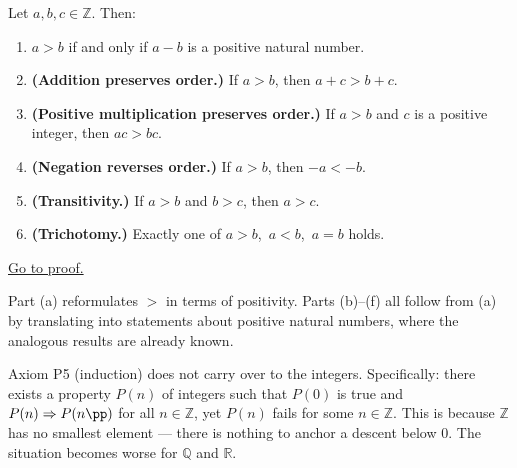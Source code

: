 \begin{lemma}
\label{lem:int-order}
Let $a, b, c \in \mathbb{Z}$. Then:
\begin{enumerate}
  \item[(a)] $a > b$ if and only if $a - b$ is a positive natural number.
  \item[(b)] \textbf{(Addition preserves order.)} If $a > b$, then $a + c > b + c$.
  \item[(c)] \textbf{(Positive multiplication preserves order.)}
    If $a > b$ and $c$ is a positive integer, then $ac > bc$.
  \item[(d)] \textbf{(Negation reverses order.)} If $a > b$, then $-a < -b$.
  \item[(e)] \textbf{(Transitivity.)} If $a > b$ and $b > c$, then $a > c$.
  \item[(f)] \textbf{(Trichotomy.)} Exactly one of $a > b$,\ $a < b$,\ $a = b$ holds.
\end{enumerate}
\hyperref[prf:int-order]{Go to proof.}
\end{lemma}

\begin{remark*}
Part (a) reformulates $>$ in terms of positivity.
Parts (b)--(f) all follow from (a) by translating into statements about
positive natural numbers, where the analogous results are already known.
\end{remark*}

\begin{remark*}
Axiom P5 (induction) does not carry over to the integers.
Specifically: there exists a property $P(n)$ of integers such that
$P(0)$ is true and $P(n) \Rightarrow P(n\pp)$ for all $n \in \mathbb{Z}$,
yet $P(n)$ fails for some $n \in \mathbb{Z}$.
This is because $\mathbb{Z}$ has no smallest element --- there is nothing
to anchor a descent below $0$.
The situation becomes worse for $\mathbb{Q}$ and $\mathbb{R}$.
\end{remark*}

